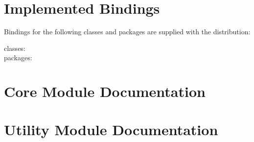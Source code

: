 \documentclass{book}
\begin{document}
\chapter[Bindings]{Implemented Bindings}\label{included.bindings}
Bindings for the following classes and packages are supplied with the distribution:
\begin{description}
\item[classes:] \CurrentClasses
\item[packages:] \CurrentPackages
\end{description}

\chapter[Modules]{Core Module Documentation}\label{coremodules}



























\chapter[Utility Modules]{Utility Module Documentation}\label{utilitymodules}


\end{document}
